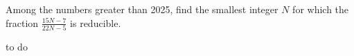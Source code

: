 Among the numbers greater than 2025, find the smallest integer $N$ for which the fraction ${\frac{15N-7}{22N-5}}$ is reducible. 

\begin{answer}
to do
\end{answer}
